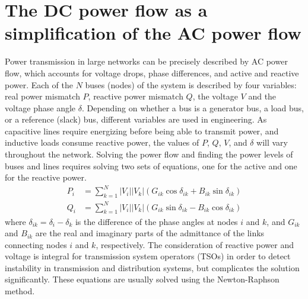 \documentclass[english,twoside,a4paper,11pt]{article}
\numberwithin{equation}{section}
\begin{document}
\section[From AC to DC]{The DC power flow as a simplification of the AC power flow}

Power transmission in large networks can be precisely described by AC
power flow, which accounts for voltage drops, phase differences, and
active and reactive power. Each of the $N$ buses (nodes) of the
system is described by four variables: real power mismatch $P$,
reactive power mismatch
$Q$, the voltage $V$ and the voltage phase angle $\delta$. Depending
on whether a bus is a generator bus, a load bus, or a reference
(slack) bus, different variables are used in engineering. As
capacitive lines require energizing before being able to transmit
power, and inductive loads consume reactive power, the values of $P$,
$Q$, $V$, and $\delta$ will vary throughout the network. Solving the
power flow and finding the power levels of buses and lines requires
solving two sets of equations, one for the active and one for the
reactive power.
\begin{align}
P_i&=\sum_{k=1}^N |V_i|
|V_k|(G_{ik}\cos\delta_{ik}+B_{ik}\sin\delta_{ik}) 
\label{eq:realAC} \\
Q_i&=\sum_{k=1}^N |V_i|
|V_k|(G_{ik}\sin\delta_{ik}-B_{ik}\cos\delta_{ik}) 
\label{eq:imagAC} 
\end{align}
where $\delta_{ik}=\delta_i-\delta_k$ is the difference of the phase
angles at nodes $i$ and $k$, and $G_{ik}$ and $B_{ik}$ are the
real and imaginary parts of the admittance of the links connecting
nodes $i$ and $k$, respectively. The consideration of reactive power
and voltage is integral for transmission system operators (TSOs) in
order to detect instability in transmission and distribution systems,
but complicates the solution significantly. These equations are
usually solved using the Newton-Raphson method.
\end{document}
